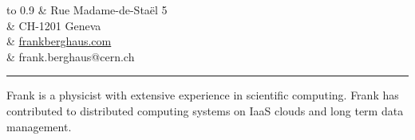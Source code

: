 \documentclass[12pt,a4paper]{article}
\newcommand{\colorrule}[1]
{
  {\color{#1}\hrule height 2pt}
  \vspace{1.0em}
}
\begin{document}
\begin{center}
	\begin{tabu} to 0.9\textwidth {X[l] X[r]}
		                                      & {\small Rue Madame-de-Staël 5} \\
																          & {\small CH-1201 Geneva} \\
																          & \href{http://www.frankberghaus.com}{\small frankberghaus.com} \\
	                                    		& {\small frank.berghaus@cern.ch} \\
	\end{tabu}
\end{center}
\colorrule{NavyBlue}
Frank is a physicist with extensive experience in scientific computing. Frank has contributed to distributed
computing systems on IaaS clouds and long term data management.
\end{document}
